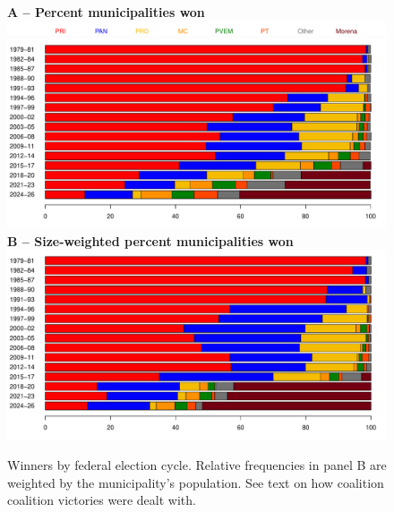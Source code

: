 \documentclass[letter,12pt]{article}
\begin{document}
\begin{figure}
  \centering
  \textbf{A -- Percent municipalities won} \\
  \includegraphics[width=.9\columnwidth]{../../plots/pctwin1979-2025-legend.pdf} \\
  \includegraphics[width=.9\columnwidth]{../../plots/pctwin1979-2025.pdf} \\
  \textbf{B -- Size-weighted percent municipalities won} \\
  \includegraphics[width=.9\columnwidth]{../../plots/pctwin-popw1979-2025.pdf}
  \caption{Winners by federal election cycle. Relative frequencies in panel B are weighted by the municipality's population. See text on how coalition coalition victories were dealt with.}\label{F:win}
\end{figure}  
\end{document}
